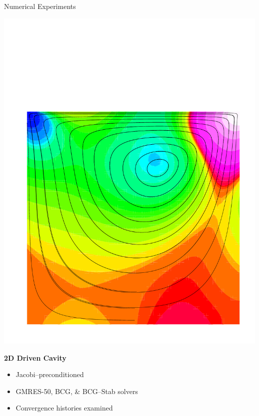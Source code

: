 \documentclass[landscape,pdftex,headrule,footrule]{foils}
\begin{document}
\begin{foil}[-.5in]{Numerical Experiments}
  \vspace{-1in}
  \begin{minipage}[h]{.5\textwidth}
    \includegraphics[width=\textwidth]{figures/flowfield-2D}
  \end{minipage}
  \begin{minipage}[h]{.5\textwidth}
    \textbf{2D Driven Cavity}
    \begin{itemize}
      \item Jacobi--preconditioned
      \item GMRES-50, BCG, \& BCG--Stab solvers
      \item Convergence histories examined
    \end{itemize}
  \end{minipage}
\end{foil}
\end{document}
